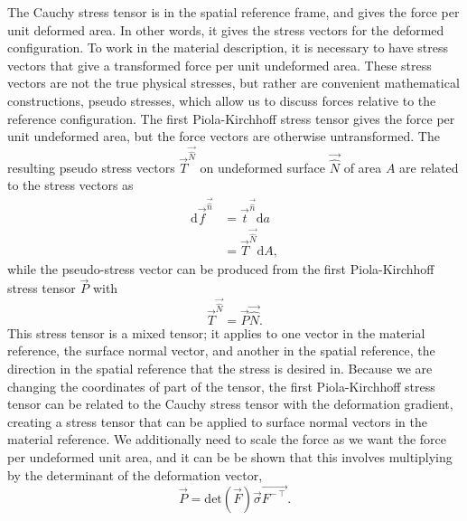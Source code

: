 The Cauchy stress tensor is in the spatial reference frame, and gives the force per unit deformed area.
In other words, it gives the stress vectors for the deformed configuration.
To work in the material description, it is necessary to have stress vectors that give a transformed force per unit undeformed area.
These stress vectors are not the true physical stresses, but rather are convenient mathematical constructions, pseudo stresses, which allow us to discuss forces relative to the reference configuration.
The first Piola-Kirchhoff stress tensor gives the force per unit undeformed area, but the force vectors are otherwise untransformed.
The resulting pseudo stress vectors $\vec{T}^{\vec{\hat{N}}}$ on undeformed surface $\vec{\hat{N}}$ of area $A$ are related to the stress vectors as
\begin{align}
    \textrm{d} \vec{f}^{\vec{\hat{n}}} &= \vec{t}^{\vec{\hat{n}}} \textrm{d} a \nonumber\\
                                       &= \vec{T}^{\vec{\hat{N}}} \textrm{d} A,
\end{align}
while the pseudo-stress vector can be produced from the first Piola-Kirchhoff stress tensor $\vec{P}$ with
\begin{equation}
    \vec{T}^{\vec{\hat{N}}} = \vec{P} \vec{\hat{N}}.
\end{equation}
This stress tensor is a mixed tensor; it applies to one vector in the material reference, the surface normal vector, and another in the spatial reference, the direction in the spatial reference that the stress is desired in.
Because we are changing the coordinates of part of the tensor, the first Piola-Kirchhoff stress tensor can be related to the Cauchy stress tensor with the deformation gradient, creating a stress tensor that can be applied to surface normal vectors in the material reference.
We additionally need to scale the force as we want the force per undeformed unit area, and it can be be shown that this involves multiplying by the determinant of the deformation vector,
\begin{equation}
    \vec{P} = \mathrm{det}(\vec{F}) \vec{\sigma} \vec{F^{-\intercal}}.
\end{equation}

